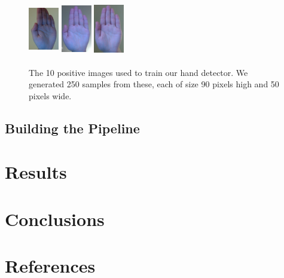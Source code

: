 \documentclass[12pt]{article}
\begin{document}
\begin{figure}[H]
\includegraphics[width=50px, height=90px]{../data/positives/img0007.jpg}
\includegraphics[width=50px, height=90px]{../data/positives/img0008.jpg}
\includegraphics[width=50px, height=90px]{../data/positives/img0009.jpg}
\caption{The 10 positive images used to train our hand detector. We generated 250 samples from these, each of size 90 pixels high and 50 pixels wide.}
\label{traininghands}
\end{figure}

\subsection{Building the Pipeline}

\section{Results}

\section{Conclusions}

\section{References}
\end{document}
